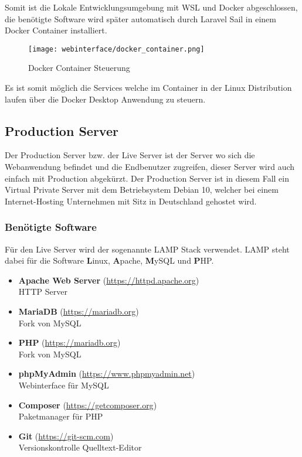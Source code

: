 Somit ist die Lokale Entwicklungsumgebung mit WSL und Docker abgeschlossen, die
benötigte Software wird später automatisch durch Laravel Sail in einem Docker
Container installiert.

\begin{figure}[H]
  \centering
  \texttt{[image: webinterface/docker\_container.png]}
  \caption{Docker Container Steuerung}
\end{figure}

Es ist somit möglich die Services welche im Container in der Linux Distribution
laufen über die Docker Desktop Anwendung zu steuern.


\subsection{Production Server}
Der Production Server bzw. der Live Server ist der Server wo sich die Webanwendung
befindet und die Endbenutzer zugreifen, dieser Server wird auch einfach mit
Production abgekürzt. Der Production Server ist in diesem Fall ein Virtual
Private Server mit dem Betriebsystem Debian 10, welcher bei einem
Internet-Hosting Unternehmen mit Sitz in Deutschland gehostet wird.


\subsubsection{Benötigte Software}

Für den Live Server wird der sogenannte \glqq LAMP\grqq{} Stack verwendet. LAMP steht dabei
für die Software \textbf{L}inux, \textbf{A}pache, \textbf{M}ySQL und \textbf{P}HP.

\begin{itemize}
  \item \textbf{Apache Web Server} (\url{https://httpd.apache.org}) \\ HTTP Server
  \item \textbf{MariaDB} (\url{https://mariadb.org}) \\ Fork von MySQL
  \item \textbf{PHP} (\url{https://mariadb.org}) \\ Fork von MySQL
  \item \textbf{phpMyAdmin} (\url{https://www.phpmyadmin.net}) \\ Webinterface
        für MySQL
  \item \textbf{Composer} (\url{https://getcomposer.org}) \\ Paketmanager für PHP
  \item \textbf{Git} (\url{https://git-scm.com}) \\ Versionskontrolle
        Quelltext-Editor
\end{itemize}


